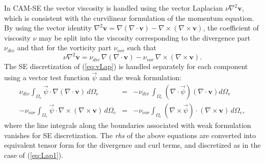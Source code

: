 \documentclass{agujournal}
\begin{document}
{ In CAM-SE the vector viscosity is handled  using the vector Laplacian $\nu \nabla^2 \mathbf{v}$, 
 which is consistent with the curvilinear formulation of the momentum equation.  By using the vector identity 
 $\nabla^2 \mathbf{v} = \nabla(\nabla \cdot \mathbf{v}) - \nabla \times (\nabla \times \mathbf{v}) $, 
 the coefficient of viscosity $\nu$ may be split into the viscosity corresponding to the divergence part $\nu_{div}$
 and that for  the vorticity part $\nu_{vor}$ such that 
 \begin{equation}
  \nu \nabla^2 \mathbf{v} = \nu_{div} \, \nabla(\nabla \cdot \mathbf{v}) -
   \nu_{vor} \,  \nabla \times (\nabla \times \mathbf{v}). \label{eq:vLap}
 \end{equation}
   The SE discretization  of (\ref{eq:vLap}) is handled separately for each component using a vector test function
   $\vec{ \psi}$ and the weak formulation: 
   \begin{eqnarray}
       \nu_{div}  \int_{\Omega_e} \vec{\psi} \cdot   \nabla(\nabla \cdot \mathbf{v})  \,    d \Omega_e  & = & 
       -  \nu_{div} \, \int_{\Omega_e} (\nabla \cdot \vec{\psi})   (\nabla \cdot \mathbf{v})   d \Omega_e \\
         -   \nu_{vor}  \int_{\Omega_e}     \vec{\psi} \cdot  \nabla \times (\nabla \times \mathbf{v})   \,    d \Omega_e  & = &
                          -   \nu_{vor}  \int_{\Omega_e} (\nabla \times      \vec{\psi} ) \cdot (\nabla \times \mathbf{v})    \,     d \Omega_e ,  
   \end{eqnarray}
   where the line integrals along the boundaries associated with weak formulation  vanishes for SE discretization. 
   The {\em rhs} of the above equations are converted into equivalent tensor form  for the divergence and curl terms,
   and discretized as in the case of (\ref{eq:Lap1}). 
   
}
\end{document}
